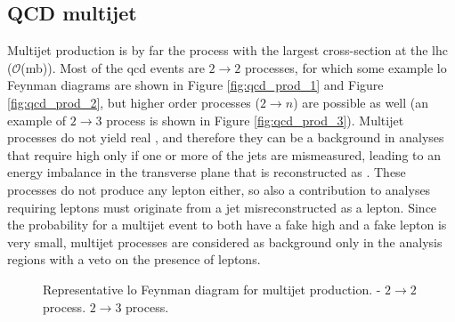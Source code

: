 \subsection{QCD multijet}

Multijet production is by far the process with the largest cross-section at the \gls{lhc} ($\mathcal{O}$(mb)). 
Most of the \gls{qcd} events are $2 \to 2$ processes, for which some example \gls{lo} Feynman diagrams are shown in Figure \ref{fig:qcd_prod_1} and Figure \ref{fig:qcd_prod_2}, but higher order processes ($2 \to n$) are possible as well (an example of $2 \to 3$ process is shown in Figure \ref{fig:qcd_prod_3}). 
Multijet processes do not yield real \met, and therefore they can be a background in analyses that require high \met only if one or more of the jets are mismeasured, leading to an energy imbalance in the transverse plane that is reconstructed as \met. 
These processes do not produce any lepton either, so also a contribution to analyses requiring leptons must originate from a jet misreconstructed as a lepton. 
Since the probability for a multijet event to both have a fake high \met and a fake lepton is very small, multijet processes are considered as background only in the analysis regions with a veto on the presence of leptons. 


\begin{figure}[h!]
\centering 
{}
\caption{Representative \gls{lo} Feynman diagram for multijet production. - $2 \to 2$ process. 
 $2 \to 3$ process.}\label{fig:qcd_prod}
\end{figure}


